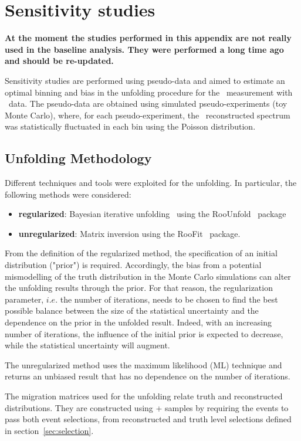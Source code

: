 \section{Sensitivity studies}
\label{sec:sensitivity}
\textbf{At the moment the studies performed in this appendix are not really used in the baseline analysis. They were performed a long time ago and should be re-updated.}

Sensitivity studies are performed using pseudo-data and aimed to estimate an optimal binning and bias in the unfolding procedure for the \ptw\ measurement with \lowmu\ data. The pseudo-data are obtained using simulated pseudo-experiments (toy Monte Carlo), where, for each pseudo-experiment, the \ptw\ reconstructed spectrum was statistically fluctuated in each bin using the Poisson distribution.

\subsection{Unfolding Methodology}
\label{app:unfoldMeth}
Different techniques and tools were exploited for the unfolding. In particular, the following methods were considered:
\begin{itemize}
\item \textbf{regularized}: Bayesian iterative unfolding~\cite{DAgostini:1994fjx,DAgostini:2010hil} using the \textsf{RooUnfold}~\cite{Adye:2011gm} package
\item \textbf{unregularized}: Matrix inversion using the \textsf{RooFit}~\cite{Verkerke:2003ir} package.
\end{itemize}

From the definition of the regularized method, the specification of an initial distribution ("prior") is required. Accordingly,  the bias from a potential mismodelling of the truth distribution in the Monte Carlo simulations can alter the unfolding results through the prior. For that reason, the regularization parameter, $i.e.$ the number of iterations, needs to be chosen to find the best possible balance between the size of the statistical uncertainty and the dependence on the prior in the unfolded result. Indeed, with an increasing number of iterations, the influence of the initial prior is expected to decrease, while the statistical uncertainty will augment.

The unregularized method uses the maximum likelihood (ML) technique and returns an unbiased result that has no dependence on the number of iterations.

The migration matrices used for the unfolding relate truth and reconstructed distributions. They are constructed using \POWHEG+ samples by requiring the events to pass both event selections, from reconstructed and truth level selections defined in section~\ref{sec:selection}.

